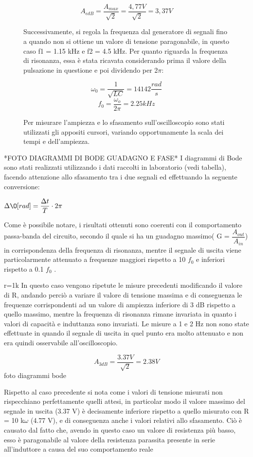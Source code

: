 \begin{figure}[ht]
\begin{minipage}{0.5\textwidth}
$$A_{\epsilon dB} = \dfrac{A_{max}}{\sqrt{2}}=\dfrac{4,77V}{\sqrt{2}}=3,37V$$

Successivamente, si regola la frequenza dal generatore di segnali fino a quando non si ottiene un valore di
tensione paragonabile, in questo caso f1 = 1.15 kHz e f2 = 4.5 kHz.
Per quanto riguarda la frequenza di risonanza, essa è stata ricavata considerando prima il valore della
pulsazione in questione e poi dividendo per 2$\pi$:

$$\omega_0=\dfrac{1}{\sqrt{LC}}=14142\dfrac{rad}{s}$$
$$f_0=\dfrac{\omega_o}{2\pi}=2.25kHz$$

Per misurare l’ampiezza e lo sfasamento sull’oscilloscopio sono stati utilizzati gli appositi cursori, variando
opportunamente la scala dei tempi e dell’ampiezza.

 \end{minipage}
\end{figure}

*FOTO DIAGRAMMI DI BODE GUADAGNO E FASE*
I diagrammi di Bode sono stati realizzati utilizzando i dati raccolti in laboratorio (vedi tabella), facendo
attenzione allo sfasamento tra i due segnali ed effettuando la seguente conversione:
\begin{center}
    

$\Delta\O[rad]=\dfrac{\Delta t}{T}\cdot 2\pi$
\end{center}
Come è possibile notare, i risultati ottenuti sono coerenti con il comportamento passa-banda del circuito,
secondo il quale si ha un guadagno massimo( G = $\dfrac{A_{out}}{A_{in}}$) in corrispondenza della frequenza di risonanza,
mentre il segnale di uscita viene particolarmente attenuato a frequenze maggiori rispetto a 10 $f_0$ e inferiori rispetto a 0.1 $f_0$ .

r=1k
In questo caso vengono ripetute le misure precedenti modificando il valore di R, andando perciò a variare il
valore di tensione massima e di conseguenza le frequenze corrispondenti ad un valore di ampiezza inferiore
di 3 dB rispetto a quello massimo, mentre la frequenza di risonanza rimane invariata in quanto i valori di
capacità e induttanza sono invariati. Le misure a 1 e 2 Hz non sono state effettuate in quando il segnale di
uscita in quel punto era molto attenuato e non era quindi osservabile all’oscilloscopio.


$$A_{3dB}=\dfrac{3.37V}{\sqrt{2}}=2.38V$$
foto diagrammi bode

Rispetto al caso precedente si nota come i valori di tensione misurati non rispecchiano perfettamente quelli
attesi, in particolar modo il valore massimo del segnale in uscita (3.37 V) è decisamente inferiore rispetto a
quello misurato con R = 10 k$\omega$ (4.77 V), e di conseguenza anche i valori relativi allo sfasamento. Ciò è causato
dal fatto che, avendo in questo caso un valore di resistenza più basso, esso è paragonabile al valore della
resistenza parassita presente in serie all’induttore a causa del suo comportamento reale


